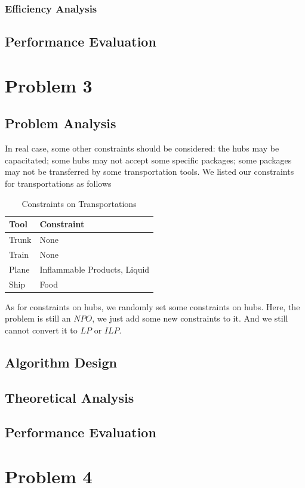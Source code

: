 \documentclass{llncs}
\begin{document}
\subsubsection{Efficiency Analysis}
\subsection{Performance Evaluation}

\section{Problem 3}
\subsection{Problem Analysis}
In real case, some other constraints should be considered: the hubs may be capacitated; some hubs may not accept some specific packages; some packages
may not be transferred by some transportation tools. We listed our constraints for transportations as follows \par
\begin{table}
  \caption{Constraints on Transportations}\label{cts1}
  \centering
  \begin{tabular}{|l|l|}
  \hline
  Tool &  Constraint \\
  \hline
  Trunk & None\\
  \hline
  Train & None\\
  \hline
  Plane & Inflammable Products, Liquid \\
  \hline
  Ship & Food \\
  \hline
  \end{tabular}
\end{table}
As for constraints on hubs, we randomly set some constraints on hubs. Here, the problem is still an $NPO$, we just add some new constraints to it.
And we still cannot convert it to $LP$ or $ILP$.
\subsection{Algorithm Design}
\subsection{Theoretical Analysis}
\subsection{Performance Evaluation}

\section{Problem 4}
\end{document}
